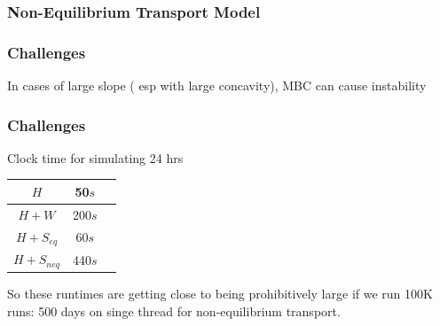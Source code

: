 \documentclass[aspectratio=169]{beamer}
\begin{document}
\begin{frame}
  \frametitle{Non-Equilibrium Transport Model} 
  \centering
\end{frame}
\begin{frame}
  \frametitle{Challenges}
  In cases of large slope ( esp with large concavity), MBC can cause instability  
  \centering
\end{frame}
\begin{frame}
  \frametitle{Challenges} 
  Clock time for simulating 24 hrs 
  \begin{center}
    \begin{tabular}{ |c|c|c| } 
      \hline
      $H$ & 50$s$ \\ 
      \hline
      $H+W$ & 200$s$ \\
      \hline
      $H+S_{eq}$ & 60$s$  \\
      \hline
      $H+S_{neq}$ & 440$s$  \\ 
      \hline
    \end{tabular}
  \end{center}
  So these runtimes are getting close to being prohibitively large if we run 100K runs: 500 days on singe thread for non-equilibrium transport. 
\end{frame}
\end{document}
